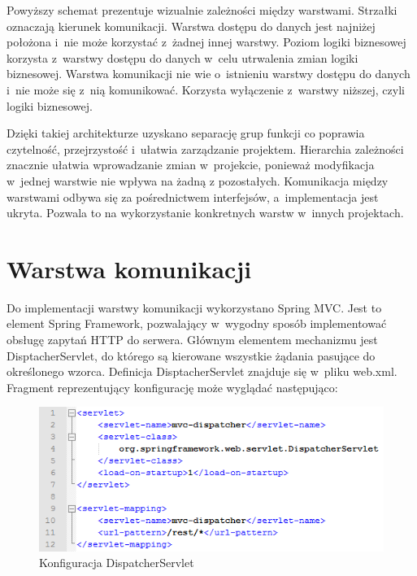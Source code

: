 Powyższy schemat prezentuje wizualnie zależności między warstwami. Strzałki oznaczają kierunek komunikacji. Warstwa dostępu do danych jest najniżej położona i~nie może korzystać z~żadnej innej warstwy. Poziom logiki biznesowej korzysta z~warstwy dostępu do danych w~celu utrwalenia zmian logiki biznesowej. Warstwa komunikacji nie wie o~istnieniu warstwy dostępu do danych i~nie może się z~nią komunikować. Korzysta wyłączenie z~warstwy niższej, czyli logiki biznesowej.

Dzięki takiej architekturze uzyskano separację grup funkcji co poprawia czytelność, przejrzystość i~ułatwia zarządzanie projektem. Hierarchia zależności znacznie ułatwia wprowadzanie zmian w~projekcie, ponieważ modyfikacja w~jednej warstwie nie wpływa na żadną z pozostałych. Komunikacja między warstwami odbywa się za pośrednictwem interfejsów, a~implementacja jest ukryta. Pozwala to na wykorzystanie konkretnych warstw w~innych projektach.


\section{Warstwa komunikacji}

Do implementacji warstwy komunikacji wykorzystano Spring MVC. Jest to element Spring Framework, pozwalający w~wygodny sposób implementować obsługę zapytań HTTP do serwera. Głównym elementem mechanizmu jest DisptacherServlet, do którego są kierowane wszystkie żądania pasujące do określonego wzorca. Definicja DisptacherServlet znajduje się w~pliku web.xml. Fragment reprezentujący konfigurację może wyglądać następująco:

\begin{figure}[H]
	\centering
	\includegraphics{images/dispatcher.png}
	\caption{Konfiguracja DispatcherServlet}
\end{figure}

